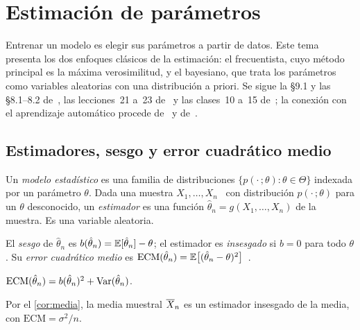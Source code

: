 \chapter{Estimación de parámetros}
\label{tema:4}

Entrenar un modelo es elegir sus parámetros a partir de datos. Este tema presenta los dos enfoques clásicos de la estimación: el frecuentista, cuyo método principal es la máxima verosimilitud, y el bayesiano, que trata los parámetros como variables aleatorias con una distribución a priori. Se sigue la §9.1 y las §8.1–8.2 de~\cite{bt}, las lecciones~21 a~23 de~\cite{mit6041} y las clases~10 a~15 de~\cite{mit1805}; la conexión con el aprendizaje automático procede de~\cite[§6.6 y §8.3]{mml} y de~\cite[§2.1–2.3]{bishop}.

\section{Estimadores, sesgo y error cuadrático medio}

\begin{definicion}
Un \emph{modelo estadístico} es una familia de distribuciones $\{p(\cdot\,;\theta):\theta\in\Theta\}$ indexada por un parámetro $\theta$. Dada una muestra $X_1,\dots,X_n$ \iid\ con distribución $p(\cdot\,;\theta)$ para un $\theta$ desconocido, un \emph{estimador} es una función $\hat\theta_n=g(X_1,\dots,X_n)$ de la muestra. Es una variable aleatoria.
\end{definicion}

\begin{definicion}
El \emph{sesgo} de $\hat\theta_n$ es $b(\hat\theta_n)=\mathbb{E}[\hat\theta_n]-\theta$; el estimador es \emph{insesgado} si $b=0$ para todo $\theta$. Su \emph{error cuadrático medio} es $\mathrm{ECM}(\hat\theta_n)=\mathbb{E}\bigl[(\hat\theta_n-\theta)^{2}\bigr]$~\cite[§9.1]{bt}.
\end{definicion}

\begin{proposicion}\label{prop:ecm}
$\mathrm{ECM}(\hat\theta_n)=b(\hat\theta_n)^{2}+\operatorname{Var}(\hat\theta_n)$.
\end{proposicion}

Por el \cref{cor:media}, la media muestral $\overline{X}_n$ es un estimador insesgado de la media, con $\mathrm{ECM}=\sigma^{2}/n$.

